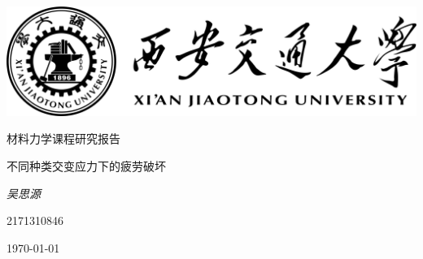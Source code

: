\documentclass[12pt, a4paper]{ctexart}
\begin{document}
\begin{titlepage}
	\centering
	\includegraphics[width=1.0\textwidth]{./templates/logo.png}\par
	\vspace{2cm}
	{\kaishu\LARGE 材料力学课程研究报告\par}
	\vspace{1.5cm}
	{\fontsize{36pt}{\baselineskip} \heiti 不同种类交变应力下的疲劳破坏\par}
	\vspace{2cm}
	{\fangsong\Large\itshape 吴思源\par}
	\vfill
	{2171310846}\par

	\vfill
	{\large \today\par}
\end{titlepage}
\end{document}

